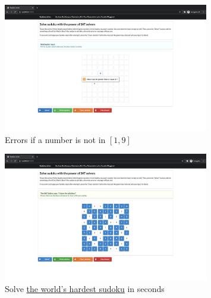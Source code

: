 \documentclass[]{usiinfprospectus}
\begin{document}
\begin{figure}[ht]
\centering
\includegraphics[width=0.8\textwidth]{pics/input_check.png}
\caption{Errors if a number is not in $ \left[ 1, 9 \right] $}
\end{figure}

\begin{figure}[ht]
\centering
\includegraphics[width=0.8\textwidth]{pics/hardest_sudoku.png}
\caption{Solve \href{https://www.mirror.co.uk/news/weird-news/worlds-hardest-sudoku-can-you-242294}{the world's hardest sudoku} in seconds}
\end{figure}



\end{document}
